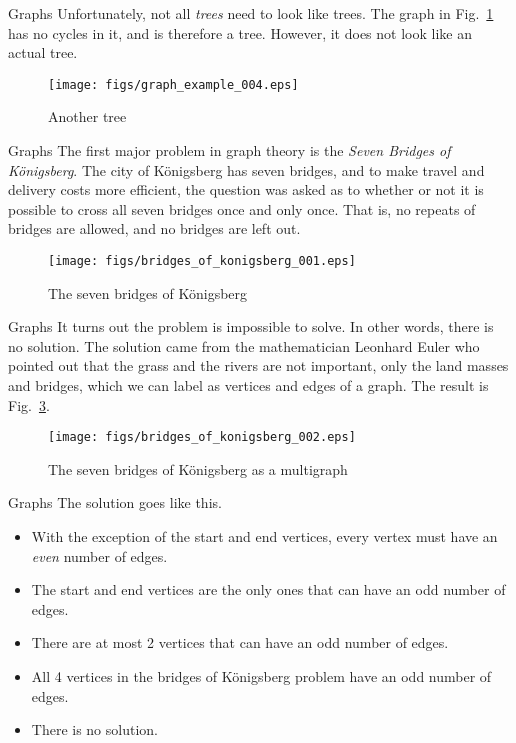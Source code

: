\documentclass{beamer}
\begin{document}
    \begin{frame}{Graphs}
        Unfortunately, not all \textit{trees} need to look like trees.
        The graph in Fig.~\ref{fig:graph_example_004} has no cycles in it,
        and is therefore a tree. However, it does not look like an actual tree.
        \begin{figure}
            \centering
            \texttt{[image: figs/graph\_example\_004.eps]}
            \caption{Another tree}
            \label{fig:graph_example_004}
        \end{figure}
    \end{frame}
    \begin{frame}{Graphs}
        The first major problem in graph theory is the \textit{Seven Bridges of K\"{o}nigsberg}.
        The city of K\"{o}nigsberg has seven bridges, and to make travel and delivery costs more efficient,
        the question was asked as to whether or not it is possible to cross all seven bridges once and
        only once. That is, no repeats of bridges are allowed, and no bridges are left out.
        \begin{figure}
            \centering
            \texttt{[image: figs/bridges\_of\_konigsberg\_001.eps]}
            \caption{The seven bridges of K\"{o}nigsberg}
            \label{fig:bridges_001}
        \end{figure}
    \end{frame}
    \begin{frame}{Graphs}
        It turns out the problem is impossible to solve. In other words, there is no solution.
        The solution came from the mathematician Leonhard Euler who pointed out that the grass and
        the rivers are not important, only the land masses and bridges, which we can label as
        vertices and edges of a graph. The result is Fig.~\ref{fig:bridges_002}.
        \begin{figure}
            \centering
            \texttt{[image: figs/bridges\_of\_konigsberg\_002.eps]}
            \caption{The seven bridges of K\"{o}nigsberg as a multigraph}
            \label{fig:bridges_002}
        \end{figure}
    \end{frame}
    \begin{frame}{Graphs}
        The solution goes like this.
        \begin{itemize}
            \item With the exception of the start and end vertices,
                every vertex must have an \textit{even} number of edges.
            \item The start and end vertices are the only ones that can have an odd number
                of edges.
            \item There are at most 2 vertices that can have an odd number of edges.
            \item All 4 vertices in the bridges of K\"{o}nigsberg problem have an odd number of edges.
            \item There is no solution.
        \end{itemize}
    \end{frame}
\end{document}
